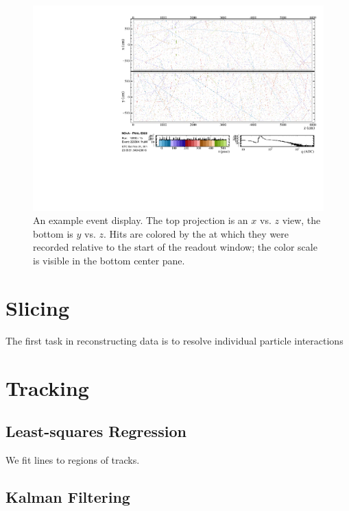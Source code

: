 \begin{figure}[t]
\begin{center}
\includegraphics[width=\textwidth]{figures/evd/evd_14db.pdf}
\end{center}
\caption{An example \nova event display.  The top projection is an $x$ vs. $z$ view, the bottom is $y$ vs. $z$.  Hits are colored by the at which they were recorded relative to the start of the readout window; the color scale is visible in the bottom center pane.}
\label{eventDisplay14}
\end{figure}

\section{Slicing}

The first task in reconstructing \nova data is to resolve individual particle interactions

\section{Tracking}

\subsection{Least-squares Regression}

We fit lines to regions of tracks.


\subsection{Kalman Filtering}

